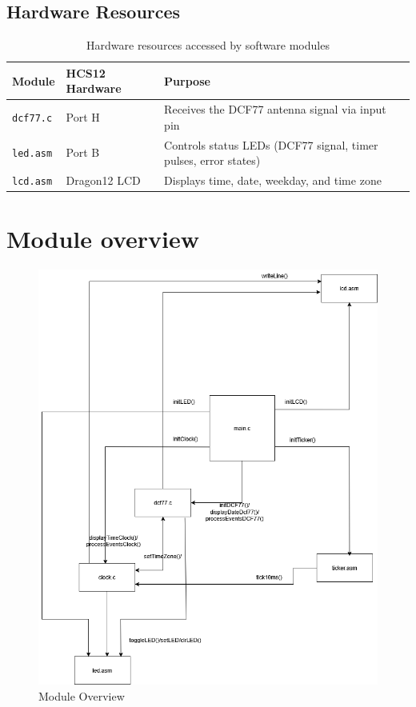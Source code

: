 \documentclass[a4paper,12pt]{article}
\begin{document}
\subsection{Hardware Resources}

\begin{table}[H]
\centering
\renewcommand{\arraystretch}{1.3}
\begin{tabularx}{\textwidth}{|L{3cm}|L{3.5cm}|X|}
\hline
\textbf{Module} & \textbf{HCS12 Hardware} & \textbf{Purpose} \\
\hline
\texttt{dcf77.c} & Port H & Receives the DCF77 antenna signal via input pin \\
\hline
\texttt{led.asm} & Port B & Controls status LEDs (DCF77 signal, timer pulses, error states) \\
\hline
\texttt{lcd.asm} & Dragon12 LCD & Displays time, date, weekday, and time zone \\
\hline
\end{tabularx}
\caption{Hardware resources accessed by software modules}
\end{table}

\newpage


\section{Module overview}

\begin{figure}[H]
    \centering
    \includegraphics[width=1\textwidth]{diagrams/1.ModuleOverview.png}
    \caption{Module Overview}
    \label{fig:ModuleOverview}
\end{figure}
\end{document}
